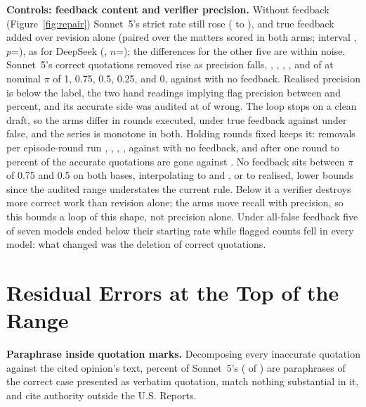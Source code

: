 \documentclass{IOS-Book-Article}
\begin{document}
\textbf{Controls: feedback content and verifier precision.} Without feedback (Figure~\ref{fig:repair}) Sonnet~5's strict rate still rose (\loopSonnetNoneStart{} to \loopSonnetNoneFinal), and true feedback added \ldiffSonnetNone{} over revision alone (paired over the \pairNSonnetNone{} matters scored in both arms; interval \lciSonnetNone, $p$=\lpSonnetNone), as for DeepSeek (\ldiffDeepseekNone, $n$=\pairNDeepseekNone); the differences for the other five are within noise. Sonnet~5's correct quotations removed rise as precision falls, \trTrueAccRemovedSonnet, \trThreeqAccRemovedSonnet, \trHalfAccRemovedSonnet, \trQuarterAccRemovedSonnet, and \trScrAccRemovedSonnet{} of \trAccRZeroSonnet{} at nominal $\pi$ of 1, 0.75, 0.5, 0.25, and 0, against \trNoneAccRemovedSonnet{} with no feedback. Realised precision is below the label, the two hand readings implying flag precision between \realisedPrecLow{} and \realisedPrecHigh{} percent, and its accurate side was audited at \auditAccChecker{} of \auditAccN{} wrong. The loop stops on a clean draft, so the arms differ in rounds executed, \rndTrueRounds{} under true feedback against \rndScrRounds{} under false, and the series is monotone in both. Holding rounds fixed keeps it: removals per episode-round run \rndTruePerRound, \rndThreeqPerRound, \rndHalfPerRound, \rndQuarterPerRound, \rndScrPerRound{} against \rndNonePerRound{} with no feedback, and after one round \rndTrueROnePct{} to \rndScrROnePct{} percent of the \rndAccRZero{} accurate quotations are gone against \rndNoneROnePct. No feedback sits between $\pi$ of 0.75 and 0.5 on both bases, interpolating to \crossNomLow{} and \crossNomHigh, or \crossRealLow{} to \crossRealHigh{} realised, lower bounds since the audited range understates the current rule. Below it a verifier destroys more correct work than revision alone; the arms move recall with precision, so this bounds a loop of this shape, not precision alone. Under all-false feedback five of seven models ended below their starting rate while flagged counts fell in every model: what changed was the deletion of correct quotations.

\section{Residual Errors at the Top of the Range}\label{sec:residual}

\textbf{Paraphrase inside quotation marks.} Decomposing every inaccurate quotation against the cited opinion's text, \decompParaPctSonnet{} percent of Sonnet~5's (\decompParaSonnet{} of \inaccTotalSonnet) are paraphrases of the correct case presented as verbatim quotation, \decompFabSonnet{} match nothing substantial in it, and \decompOutSonnet{} cite authority outside the U.S. Reports.
\end{document}

